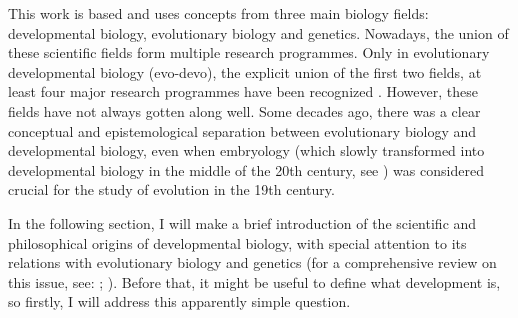 This work is based and uses concepts from three main biology fields: 
developmental biology, evolutionary biology and genetics.
Nowadays, the union of these scientific fields form multiple research programmes. 
Only in evolutionary developmental biology (evo-devo), the explicit union of the first two fields, at least four major research programmes have been recognized \citep{Muller2007}.
However, these fields have not always gotten along well. 
Some decades ago, there was a clear conceptual and epistemological separation between evolutionary biology and developmental biology, even when embryology (which slowly transformed into developmental biology in the middle of the 20th century, see \citealp{Horder2010}) was considered crucial for the study of evolution in the 19th century.

In the following section, I will make a brief introduction of the scientific and philosophical origins of developmental biology, with special attention to its relations with evolutionary biology and genetics (for a comprehensive review on this issue, see: \citealp{amundson2005changing}; \citealp{gilbert1991conceptual}).
Before that, it might be useful to define what development is, so firstly, I will address this apparently simple question.